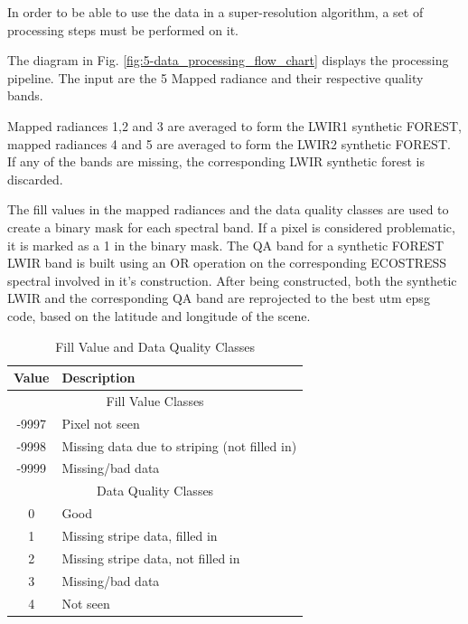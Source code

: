 In order to be able to use the data in a super-resolution algorithm, a set of processing steps must be performed on it.

The diagram in Fig. \ref{fig:5-data_processing_flow_chart} displays the processing pipeline. The input are the 5 Mapped radiance and their respective quality bands.

Mapped radiances 1,2 and 3 are averaged to form the LWIR1 synthetic FOREST, mapped radiances 4 and 5 are averaged to form the LWIR2 synthetic FOREST. If any of the bands are missing, the corresponding LWIR synthetic forest is discarded. 

The fill values in the mapped radiances and the data quality classes are used to create a binary mask for each spectral band. If a pixel is considered problematic, it is marked as a 1 in the binary mask. The QA band for a synthetic FOREST LWIR band is built using an OR operation on the corresponding ECOSTRESS spectral involved in it's construction. After being constructed, both the synthetic LWIR and the corresponding QA band are reprojected to the best utm epsg code, based on the latitude and longitude of the scene.

\begin{table}[h!]
    \centering
    
    \label{tab:quality_classes}
    \begin{tabular}{cl}
        \toprule
        \textbf{Value} & \textbf{Description}                \\
        \midrule
        \multicolumn{2}{c}{Fill Value Classes}                \\
        -9997          & Pixel not seen                       \\
        -9998          & Missing data due to striping (not filled in) \\
        -9999          & Missing/bad data                     \\
        \midrule
        \multicolumn{2}{c}{Data Quality Classes}              \\
        0              & Good                                 \\
        1              & Missing stripe data, filled in       \\
        2              & Missing stripe data, not filled in   \\
        3              & Missing/bad data                     \\
        4              & Not seen                             \\
        \bottomrule
    \end{tabular}
    \caption{Fill Value and Data Quality Classes}
\end{table}

